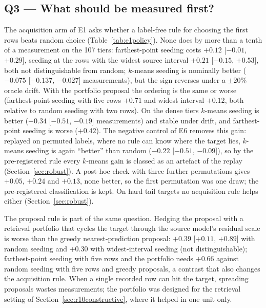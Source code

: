 \documentclass[11pt,a4paper]{article}
\begin{document}
\subsection{Q3 --- What should be measured first?}
\label{sec:q3}
The acquisition arm of E1 asks whether a label-free rule for choosing the first rows beats
random choice (Table~\ref{tab:e1policy}). None does by more than a tenth of a measurement on the 107
tiers: farthest-point seeding costs $+0.12$ [$-0.01$, $+0.29$], seeding at the rows with the widest
source interval $+0.21$ [$-0.15$, $+0.53$], both not distinguishable from random; $k$-means seeding
is nominally better ($-0.075$ [$-0.137$, $-0.027$] measurements), but the sign reverses under a
$\pm 20\%$ oracle drift. With the portfolio proposal the ordering is the same or worse
(farthest-point seeding with five rows $+0.71$ and widest interval $+0.12$, both relative to random
seeding with two rows). On the dense tiers $k$-means seeding is better ($-0.34$ [$-0.51$, $-0.19$]
measurements) and stable under drift, and farthest-point seeding is worse ($+0.42$). The negative control of E6 removes this
gain: replayed on permuted labels, where no rule can know where the target lies, $k$-means
seeding is again ``better'' than random ($-0.22$ [$-0.51$, $-0.09$]), so by the pre-registered rule
every $k$-means gain is classed as an artefact of the replay (Section~\ref{sec:robust}). A post-hoc
check with three further permutations gives $+0.05$, $+0.24$ and $+0.13$, none better, so
the first permutation was one draw; the pre-registered classification is kept. On hard tail targets
no acquisition rule helps either (Section~\ref{sec:robust}).

The proposal rule is part of the same question. Hedging the proposal with a retrieval portfolio
that cycles the target through the source model's residual scale is worse than the greedy
nearest-prediction proposal: $+0.39$ [$+0.11$, $+0.89$] with random seeding and $+0.30$ with
widest-interval seeding (not distinguishable); farthest-point seeding with five rows and the
portfolio needs $+0.66$ against random seeding with five rows and greedy proposals, a contrast that
also changes the acquisition rule. When a single recorded row can hit the target, spreading
proposals wastes measurements; the portfolio was designed for the retrieval setting of
Section~\ref{sec:r10constructive}, where it helped in one unit only.
\end{document}

